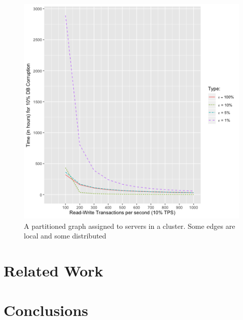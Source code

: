 \documentclass[sigplan,screen]{acmart}
\begin{document}
\begin{figure}[h]
  \centering
  \includegraphics[width=\linewidth]{./images/corruption_comparison}
  \caption{A partitioned graph assigned to servers in a cluster. Some edges are local and some distributed}
  \label{dist-graph}
\end{figure}


\section{Related Work}

\section{Conclusions}


\end{document}

